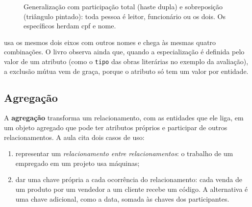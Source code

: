 \begin{figure}[h]
\centering
{}
\caption{Generalização com participação total (haste dupla) e sobreposição
(triângulo pintado): toda pessoa é leitor, funcionário ou os dois. Os
específicos herdam cpf e nome.}
\end{figure}

\textcite[seção 8.3]{Elmasri2011} usa os mesmos dois eixos com outros
nomes e chega às mesmas quatro combinações. O livro observa ainda que,
quando a especialização é definida pelo valor de um atributo (como o
\texttt{tipo} das obras literárias no exemplo da avaliação), a exclusão
mútua vem de graça, porque o atributo só tem um valor por entidade.

\subsection{Agregação}

A \textbf{agregação} transforma um relacionamento, com
as entidades que ele liga, em um objeto agregado que pode ter atributos
próprios e participar de outros relacionamentos. A aula cita dois casos
de uso:

\begin{enumerate}
	\item representar um \emph{relacionamento entre relacionamentos}: o
	trabalho de um empregado em um projeto usa máquinas;
	\item dar uma chave própria a cada ocorrência do relacionamento: cada
	venda de um produto por um vendedor a um cliente recebe um código. A
	alternativa é uma chave adicional, como a data, somada às chaves dos
	participantes.
\end{enumerate}

